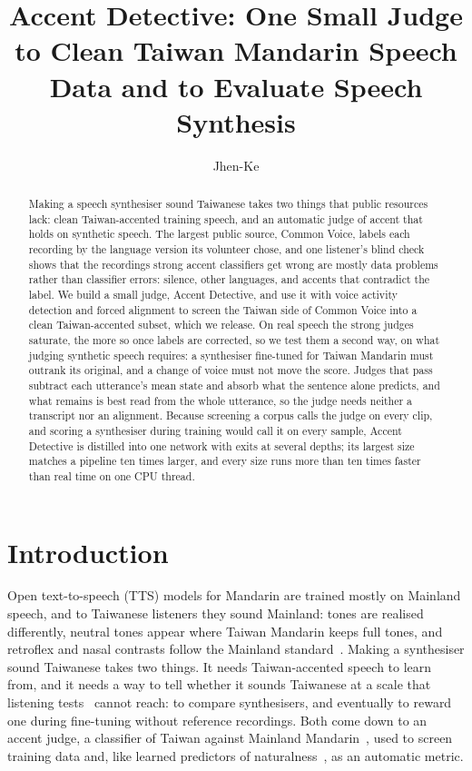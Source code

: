 \documentclass{Interspeech}
\title{Accent Detective: One Small Judge to Clean Taiwan Mandarin Speech Data and to Evaluate Speech Synthesis}
\author[affiliation=1]{Jhen-Ke}{Lin}
\affiliation{}{National Yang Ming Chiao Tung University}{Taiwan}
\begin{document}
\maketitle
{}

\begin{abstract}
Making a speech synthesiser sound Taiwanese takes two things that public resources lack: clean Taiwan-accented training speech, and an automatic judge of accent that holds on synthetic speech. The largest public source, Common Voice, labels each recording by the language version its volunteer chose, and one listener's blind check shows that the recordings strong accent classifiers get wrong are mostly data problems rather than classifier errors: silence, other languages, and accents that contradict the label. We build a small judge, Accent Detective, and use it with voice activity detection and forced alignment to screen the Taiwan side of Common Voice into a clean Taiwan-accented subset, which we release. On real speech the strong judges saturate, the more so once labels are corrected, so we test them a second way, on what judging synthetic speech requires: a synthesiser fine-tuned for Taiwan Mandarin must outrank its original, and a change of voice must not move the score. Judges that pass subtract each utterance's mean state and absorb what the sentence alone predicts, and what remains is best read from the whole utterance, so the judge needs neither a transcript nor an alignment. Because screening a corpus calls the judge on every clip, and scoring a synthesiser during training would call it on every sample, Accent Detective is distilled into one network with exits at several depths; its largest size matches a pipeline ten times larger, and every size runs more than ten times faster than real time on one CPU thread.
\end{abstract}

\section{Introduction}

Open text-to-speech (TTS) models for Mandarin are trained mostly on Mainland speech, and to Taiwanese listeners they sound Mainland: tones are realised differently, neutral tones appear where Taiwan Mandarin keeps full tones, and retroflex and nasal contrasts follow the Mainland standard~\cite{kubler1985influence,fon1999chao}. Making a synthesiser sound Taiwanese takes two things. It needs Taiwan-accented speech to learn from, and it needs a way to tell whether it sounds Taiwanese at a scale that listening tests~\cite{zhong2025pairwise} cannot reach: to compare synthesisers, and eventually to reward one during fine-tuning without reference recordings. Both come down to an accent judge, a classifier of Taiwan against Mainland Mandarin~\cite{shi2021aesrc,zuluaga2023commonaccent,zhong2024accentbox,feng2025voxlect}, used to screen training data and, like learned predictors of naturalness~\cite{saeki2022utmos}, as an automatic metric.
\end{document}

